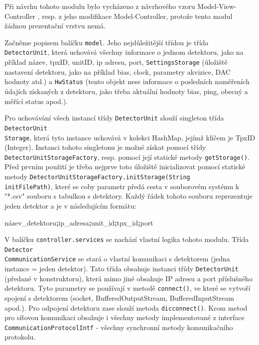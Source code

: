 Při návrhu tohoto modulu bylo vycházeno z návrhového vzoru Model-View-Controller \cite{DesignPatterns-Gamma:1995:DPE:186897}, resp. z jeho modifikace Model-Controller, protože tento modul žádnou prezentační vrstvu nemá. 

Začněme popisem balíčku \texttt{model}. Jeho nejdůležitější třídou je třída \texttt{DetectorUnit}, která uchovává všechny informace o jednom detektoru, jako na příklad název, tpxID, unitID, ip adresu, port, \texttt{SettingsStorage} (úložiště nastavení detektoru, jako na příklad bias, clock, parametry akvizice, DAC hodnoty atd.) a \texttt{HwStatus} (tento objekt nese informace o posledních naměřeních údajích získaných z detektoru, jako třeba aktuální hodnoty bias, ping, obecný a měřící status apod.).

Pro uchovávání všech instancí třídy \texttt{DetectorUnit} slouží singleton \cite{DesignPatterns-Gamma:1995:DPE:186897} třída \texttt{DetectorUnit\\Storage}, která tyto instance uchovává v kolekci HashMap, jejímž klíčem je TpxID (Integer). Instanci tohoto singletonu je možné získat pomocí třídy \texttt{DetectorUnitStorageFactory}, resp. pomocí její statické metody \texttt{getStorage()}. Před prvním použití je třeba nejprve toto úložiště inicializovat pomocí statické metody \texttt{DetectorUnitStorageFactory.initStorage(String\\initFilePath)}, které se coby parametr předá cesta v souborovém systému k "*.csv" souboru s tabulkou s detektory. Každý řádek tohoto souboru reprezentuje jeden detektor a je v následujícím formátu:
\begin{center}
	název\_detektoru\textbf{\Large{;}}ip\_adresa\textbf{\Large{;}}unit\_id\textbf{\Large{;}}tpx\_id\textbf{\Large{;}}port
\end{center}

V balíčku \texttt{controller.services} se nachází vlastní logika tohoto modulu. 
Třída \texttt{Detector\\CommunicationService} se stará o vlastní komunikaci s detektorem (jedna instance = jeden detektor). Tato třída obsahuje instanci třídy \texttt{DetectorUnit} (předané v konstruktoru), která mimo jiné obsahuje IP adresu a port příslušného detektoru. Tyto parametry se používají v metodě \texttt{connect()}, ve které se vytvoří spojení s detektorem (socket, BufferedOutputStream, BufferedInputStream apod.). Pro odpojení detektoru zase slouží metoda \texttt{dicconnect()}. Krom metod pro síťovou komunikaci obsahuje i všechny metody implementované z interface \texttt{CommunicationProtocolIntf} - všechny synchronní metody komunikačního protokolu. 

